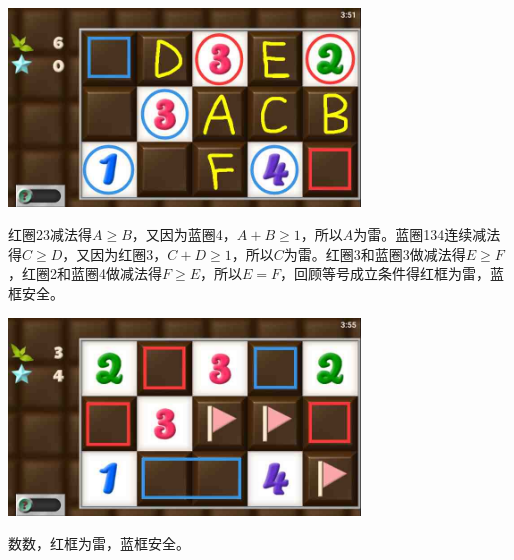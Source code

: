 \subsection{} %
\begin{center}
    \includegraphics[width=0.7\textwidth]{puzzlelow/97-1.jpg}
\end{center}
红圈23减法得$A\ge B$，又因为蓝圈4，$A+B\ge 1$，所以$A$为雷。蓝圈134连续减法得$C\ge D$，又因为红圈3，$C+D\ge 1$，所以$C$为雷。红圈3和蓝圈3做减法得$E\ge F$，红圈2和蓝圈4做减法得$F\ge E$，所以$E=F$，回顾等号成立条件得红框为雷，蓝框安全。
\begin{center}
    \includegraphics[width=0.7\textwidth]{puzzlelow/97-2.jpg}
\end{center}
数数，红框为雷，蓝框安全。

